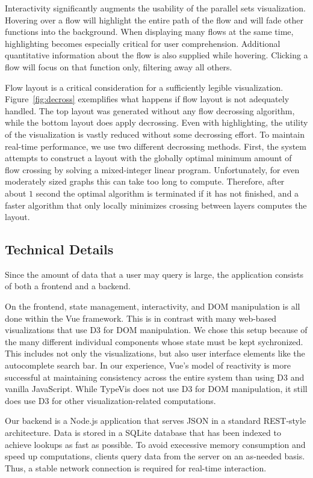 \documentclass{vgtc}                          %
\begin{document}
Interactivity significantly augments the
usability of the parallel sets visualization.
Hovering over a flow will highlight the
entire path of the flow
and will fade other functions
into the background.
When displaying many flows at the same time,
highlighting becomes especially critical
for user comprehension.
Additional quantitative information
about the flow is also supplied
while hovering.
Clicking a flow will focus on that function
only, filtering away all others.

Flow layout is a critical consideration
for a sufficiently legible visualization.
Figure~\ref{fig:decross} exemplifies what
happens if flow layout is not adequately handled.
The top layout was generated without any
flow decrossing algorithm,
while the bottom layout does
apply decrossing.
Even with highlighting,
the utility of the visualization is vastly
reduced without some decrossing effort.
To maintain real-time performance,
we use two different decrossing methods.
First, the system attempts to construct
a layout with the globally optimal
minimum amount of flow crossing by
solving a mixed-integer linear program.
Unfortunately, for even moderately
sized graphs this can take too long to compute.
Therefore, after about $1$ second
the optimal algorithm is terminated
if it has not finished, and a faster
algorithm that only locally minimizes crossing
between layers computes the layout.

\subsection{Technical Details}

Since the amount of data that a user may query is large,
the application consists of both a frontend and a backend.

On the frontend, state management, interactivity,
and DOM manipulation is all done within the Vue framework.
This is in contrast with many web-based visualizations
that use D3 for DOM manipulation.
We chose this setup because of the many different
individual components whose state must be kept
sychronized.
This includes not only the visualizations, but also
user interface elements like the autocomplete search bar.
In our experience, Vue's model of reactivity is
more successful at maintaining consistency across the
entire system than using D3 and vanilla JavaScript.
While {\sc TypeVis} does not use D3 for DOM manipulation,
it still does use D3 for other visualization-related
computations.

Our backend is a Node.js application that serves
JSON in a standard REST-style architecture.
Data is stored in a SQLite database that has been
indexed to achieve lookups as fast as possible.
To avoid execessive memory consumption and speed up computations,
clients query data from the server on an as-needed basis.
Thus, a stable network connection is required for
real-time interaction.
\end{document}

